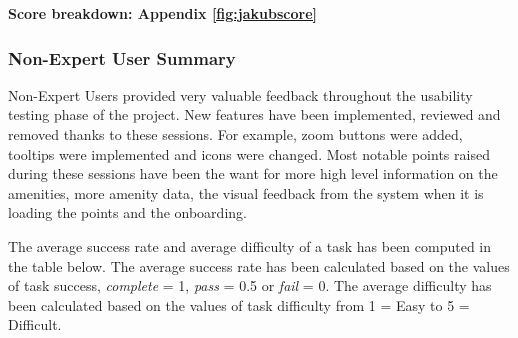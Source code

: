 \textbf{Score breakdown: Appendix \ref{fig:jakubscore}}

\subsubsection{Non-Expert User Summary}
Non-Expert Users provided very valuable feedback throughout the usability testing
phase of the project. New features have been implemented, reviewed and removed
thanks to these sessions.
For example, zoom buttons were added, tooltips were implemented and icons were
changed. Most notable points raised during these sessions have been the want for
more high level information on the amenities, more amenity data, the visual
feedback from the system when it is loading the points and the onboarding.

The average success rate and average difficulty of a task has been computed in
the table below. The average success rate has been calculated based on the
values of task success, \emph{complete} = 1, \emph{pass} = 0.5 or \emph{fail} =
0.
The average difficulty has been calculated based on the values of task
difficulty from 1 = Easy to 5 = Difficult.

